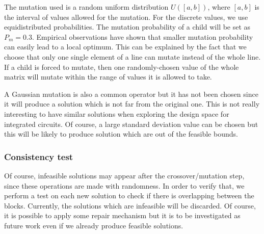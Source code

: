 The mutation used is a random uniform distribution $U([a, b])$, where $[a, b]$ is the interval of values allowed for the mutation. For the discrete values, we use equidistributed probabilities. The mutation probability of a child will be set as $P_{m} = 0.3$. Empirical observations have shown that smaller mutation probability can easily lead to a local optimum. This can be explained by the fact that we choose that only one single element of a line can mutate instead of the whole line. If a child is forced to mutate, then one randomly-chosen value of the whole matrix will mutate within the range of values it is allowed to take.

A Gaussian mutation is also a common operator but it has not been chosen since it will produce a solution which is not far from the original one. This is not really interesting to have similar solutions when exploring the design space for integrated circuits. Of course, a large standard deviation value can be chosen but this will be likely to produce solution which are out of the feasible bounds.

\subsubsection{Consistency test}
Of course, infeasible solutions may appear after the crossover/mutation step, since these operations are made with randomness. In order to verify that, we perform a test on each new solution to check if there is overlapping between the blocks. Currently, the solutions which are infeasible will be discarded. Of course, it is possible to apply some repair mechanism but it is to be investigated as future work even if we already produce feasible solutions.

